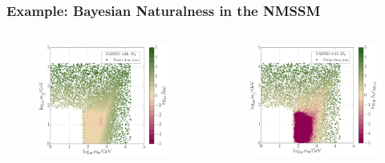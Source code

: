 \documentclass[10pt,aspectratio=169]{beamer}
\begin{document}
\begin{frame}
  \frametitle{Example: Bayesian Naturalness in the NMSSM}
  \begin{columns}[t]
    \begin{column}{0.6\textwidth}
      \vspace*{-30pt}
      \begin{columns}[t]
        \begin{column}{0.5\textwidth}
          \begin{figure}
            \centering
            \includegraphics[width=1.1\textwidth]{CNMSSM_BG_m0m12}
          \end{figure}
        \end{column}
        \begin{column}{0.5\textwidth}
          \begin{figure}
            \centering
            \includegraphics[width=1.1\textwidth]{CNMSSM_GUT_J_m0m12}

\end{figure}
\end{column}
\end{columns}
\end{column}
\end{columns}
\end{frame}
\end{document}
